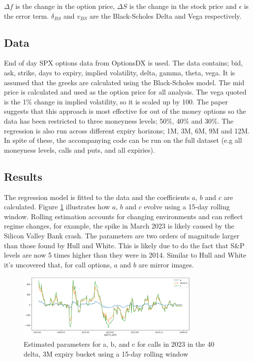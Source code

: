\documentclass{article}
\begin{document}
$\Delta f$ is the change in the option price, $\Delta S$ is the change in the stock price and $\epsilon$ is the error term. $\delta_{BS}$ and $v_{BS}$ are the Black-Scholes 
Delta and Vega respectively.    

\subsection{Data}

End of day SPX options data from OptionsDX is used. The data contains; bid, ask, strike, days to expiry, implied volatility, delta, gamma, theta, vega. It is assumed
that the greeks are calculated using the Black-Scholes model. The mid price is calculated and used as the option price for all analysis. The vega quoted is the 1\% 
change in implied volatility, so it is scaled up by 100.  The paper suggests that this approach is most effective for out of the money options so the data has been restricted to
three moneyness levels; 50\%, 40\% and 30\%. The regression is also run across different expiry horizons; 1M, 3M, 6M, 9M and 12M.  In spite of these, the accompanying
code can be run on the full dataset (e.g all moneyness levels, calls and puts, and all expiries).

\subsection{Results}

The regression model is fitted to the data and the coefficients $a$, $b$ and $c$ are calculated.  Figure \ref{fig:a_b_c} illustrates how $a$, $b$ and $c$ evolve using a 15-day rolling window.
Rolling estimation accounts for changing environments and can reflect regime changes, for example, the spike in March 2023 is likely caused by the Silicon Valley Bank crash.  The parameters are
two orders of magnitude larger than those found by Hull and White. This is likely due to do the fact that S\&P levels are now 5 times higher than they were in 2014. Similar to Hull and White
\cite{hull} it's uncovered that, for call options, $a$ and $b$ are mirror images.

\begin{figure}[h]
    \centering
    \includegraphics[width=0.8\textwidth]{images/a_b_c.png}
    \caption{Estimated parameters for a, b, and c for calls in 2023 in the 40 delta, 3M expiry bucket using a 15-day rolling window}
    \label{fig:a_b_c}
\end{figure}
\end{document}
